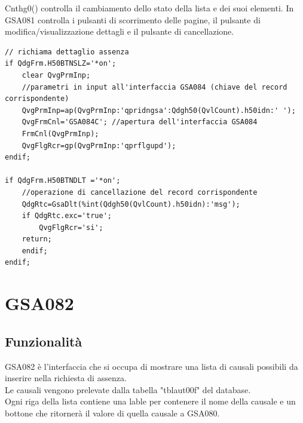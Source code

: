 \documentclass[target=bach,aauheader=,style=]{thud}
\begin{document}
Cnthg0() controlla il cambiamento dello stato della lista e dei suoi elementi.
In GSA081 controlla i pulsanti di scorrimento delle pagine, il pulsante di modifica/visualizzazione dettagli e il pulsante di cancellazione.
\begin{lstlisting}[language=RPG, caption=Codice RPG di controllo dei pulsanti]
// richiama dettaglio assenza
if QdgFrm.H50BTNSLZ='*on';
    clear QvgPrmInp;
    //parametri in input all'interfaccia GSA084 (chiave del record corrispondente)
    QvgPrmInp=ap(QvgPrmInp:'qpridngsa':Qdgh50(QvlCount).h50idn:' ');
    QvgFrmCnl='GSA084C'; //apertura dell'interfaccia GSA084
    FrmCnl(QvgPrmInp);
    QvgFlgRcr=gp(QvgPrmInp:'qprflgupd');
endif;

if QdgFrm.H50BTNDLT ='*on';
    //operazione di cancellazione del record corrispondente
    QdgRtc=GsaDlt(%int(Qdgh50(QvlCount).h50idn):'msg'); 
    if QdgRtc.exc='true';
        QvgFlgRcr='si';
    return;
    endif;
endif;
\end{lstlisting}
\break




\section{GSA082}

\subsection{Funzionalità}
GSA082 è l'interfaccia che si occupa di mostrare una lista di causali possibili da inserire nella richiesta di assenza.
\\Le causali vengono prelevate dalla tabella "tblaut00f" del database.
\\Ogni riga della lista contiene una lable per contenere il nome della causale e un bottone che ritornerà il valore di quella causale a GSA080.
\end{document}
